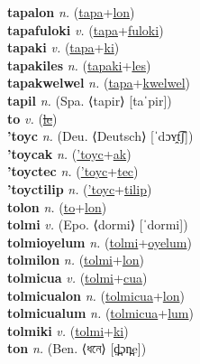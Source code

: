 \textbf{tapalon} \textit{n.} (\hyperref[tapa]{tapa}+\hyperref[lon]{lon})
 \label{tapalon} \\
\textbf{tapafuloki} \textit{v.} (\hyperref[tapa]{tapa}+\hyperref[fuloki]{fuloki})
 \label{tapafuloki} \\
\textbf{tapaki} \textit{v.} (\hyperref[tapa]{tapa}+\hyperref[ki]{ki})
 \label{tapaki} \\
\textbf{tapakiles} \textit{n.} (\hyperref[tapaki]{tapaki}+\hyperref[les]{les})
 \label{tapakiles} \\
\textbf{tapakwelwel} \textit{n.} (\hyperref[tapa]{tapa}+\hyperref[kwelwel]{kwelwel})
 \label{tapakwelwel} \\
\textbf{tapil} \textit{n.} (Spa. ⟨tapir⟩ [taˈpir])
 \label{tapil} \\
\textbf{to} \textit{v.} (\hyperref[le]{\sout{le}})
 \label{to} \\
\textbf{'toyc} \textit{n.} (Deu. ⟨Deutsch⟩ [ˈdɔʏ̯t͡ʃ])
 \label{'toyc} \\
\textbf{'toycak} \textit{n.} (\hyperref['toyc]{'toyc}+\hyperref[ak]{ak})
 \label{'toycak} \\
\textbf{'toyctec} \textit{n.} (\hyperref['toyc]{'toyc}+\hyperref[tec]{tec})
 \label{'toyctec} \\
\textbf{'toyctilip} \textit{n.} (\hyperref['toyc]{'toyc}+\hyperref[tilip]{tilip})
 \label{'toyctilip} \\
\textbf{tolon} \textit{n.} (\hyperref[to]{to}+\hyperref[lon]{lon})
 \label{tolon} \\
\textbf{tolmi} \textit{v.} (Epo. ⟨dormi⟩ [ˈdormi])
 \label{tolmi} \\
\textbf{tolmioyelum} \textit{n.} (\hyperref[tolmi]{tolmi}+\hyperref[oyelum]{oyelum})
 \label{tolmioyelum} \\
\textbf{tolmilon} \textit{n.} (\hyperref[tolmi]{tolmi}+\hyperref[lon]{lon})
 \label{tolmilon} \\
\textbf{tolmicua} \textit{v.} (\hyperref[tolmi]{tolmi}+\hyperref[cua]{cua})
 \label{tolmicua} \\
\textbf{tolmicualon} \textit{n.} (\hyperref[tolmicua]{tolmicua}+\hyperref[lon]{lon})
 \label{tolmicualon} \\
\textbf{tolmicualum} \textit{n.} (\hyperref[tolmicua]{tolmicua}+\hyperref[lum]{lum})
 \label{tolmicualum} \\
\textbf{tolmiki} \textit{v.} (\hyperref[tolmi]{tolmi}+\hyperref[ki]{ki})
 \label{tolmiki} \\
\textbf{ton} \textit{n.} (Ben. ⟨ধনে⟩ [d̪̤ɔn̪e])
 \label{ton} \\
